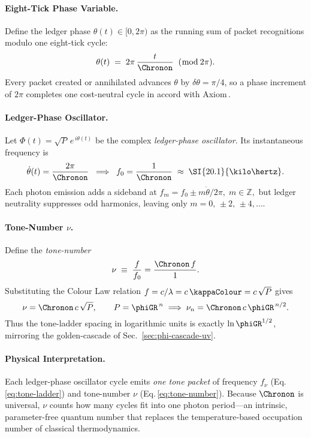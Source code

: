 \documentclass[11pt,oneside]{book}
\begin{document}
{\paragraph{Eight-Tick Phase Variable.}
Define the ledger phase
\(
   \theta(t)\in[0,2\pi)
\)
as the running sum of packet recognitions modulo one
eight-tick cycle:
\[
   \theta(t)
   \;=\;
   2\pi\,\frac{t}{\Chronon}
   \;\;(\bmod\,2\pi).
\]
Every packet created or annihilated advances $\theta$ by
\(
   \delta\theta=\pi/4
\),
so a phase increment of $2\pi$ completes one cost-neutral cycle in
accord with Axiom\,.

\paragraph{Ledger-Phase Oscillator.}
Let
\(
   \Phi(t)=\sqrt{P}\,e^{\,i\theta(t)}
\)
be the complex \emph{ledger-phase oscillator}.
Its instantaneous frequency is
\[
   \dot\theta(t)
   =
   \frac{2\pi}{\Chronon}
   \;\;\Longrightarrow\;\;
   f_{0}
   =
   \frac{1}{\Chronon}
   \;\approx\;
   \SI{20.1}{\kilo\hertz}.
\]
Each photon emission adds a sideband at
\(
   f_{m}=f_{0}\pm m\dot\theta/2\pi,
   \;m\in\mathbb Z,
\)
but ledger neutrality suppresses odd harmonics, leaving only
\(
   m=0,\,\pm2,\,\pm4,\dots
\).

\paragraph{Tone-Number $\nu$.}
Define the \emph{tone-number}
\[
   \nu
   \;\equiv\;
   \frac{f}{f_{0}}
   =
   \frac{\Chronon\,f}{1}.
   \label{eq:tone-number}
\]
Substituting the Colour Law relation
\(
   f=c/\lambda
   = c\,\kappaColour
   = c\,\sqrt{P}
\)
gives
\[
   \nu
   =
   \Chronon\,c\,\sqrt{P},
   \qquad
   P=\phiGR^{\,n}\;\Longrightarrow\;
   \nu_{n}= \Chronon\,c\,\phiGR^{\,n/2}.
\]
Thus the tone-ladder spacing in logarithmic units is exactly
$\ln\phiGR^{1/2}$, mirroring the golden-cascade of
Sec.~\ref{sec:phi-cascade-uv}.

\paragraph{Physical Interpretation.}
Each ledger-phase oscillator cycle emits
\emph{one tone packet} of frequency
\(f_{\nu}\) (Eq.\,\ref{eq:tone-ladder})
and tone-number $\nu$ (Eq.\,\ref{eq:tone-number}).
Because $\Chronon$ is universal, $\nu$ counts how many cycles fit into
one photon period—an intrinsic, parameter-free quantum number that
replaces the temperature‐based occupation number of classical
thermodynamics.

}
\end{document}

